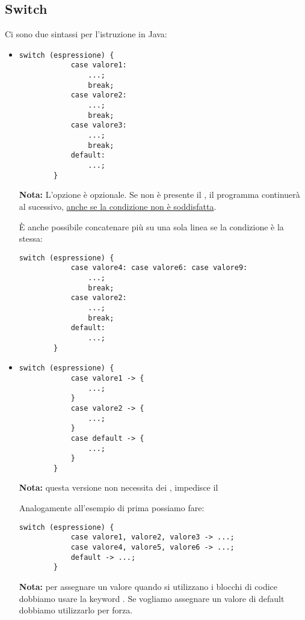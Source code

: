 \documentclass[../main.tex]{subfiles}
\begin{document}
\subsection{Switch}
Ci sono due sintassi per l'istruzione  in Java:
\begin{itemize}
    \item \begin{lstlisting}[style=java]
        switch (espressione) {
            case valore1:
                ...;
                break;
            case valore2:
                ...;
                break;
            case valore3:
                ...;
                break;
            default:
                ...;
        }
    \end{lstlisting}
    \textbf{Nota:} L'opzione  è opzionale. Se non è presente il , il programma continuerà al  sucessivo,
    \underline{anche se la condizione non è soddisfatta}.

    È anche possibile concatenare più  su una sola linea se la condizione è la stessa:
    \begin{lstlisting}[style=java]
        switch (espressione) {
            case valore4: case valore6: case valore9:
                ...;
                break;
            case valore2:
                ...;
                break;
            default:
                ...;
        }
    \end{lstlisting}

    \item \begin{lstlisting}[style=java]
        switch (espressione) {
            case valore1 -> {
                ...;
            }
            case valore2 -> {
                ...;
            }
            case default -> {
                ...;
            }
        }
    \end{lstlisting}
    \textbf{Nota:} questa versione non necessita dei , impedisce il 

    \vspace{0.5cm}
    Analogamente all'esempio di prima possiamo fare:
    \begin{lstlisting}[style=java]
        switch (espressione) {
            case valore1, valore2, valore3 -> ...;
            case valore4, valore5, valore6 -> ...;
            default -> ...;
        }
    \end{lstlisting}
    \textbf{Nota:} per assegnare un valore quando si utilizzano i blocchi di codice dobbiamo usare la keyword .
    Se vogliamo assegnare un valore di default dobbiamo utilizzarlo per forza.
\end{itemize}
\end{document}
